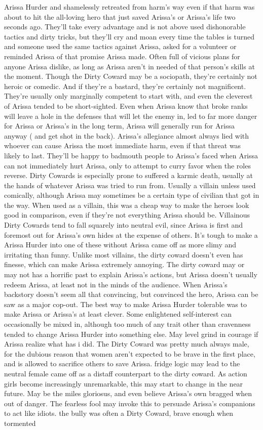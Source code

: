 \documentclass[12pt]{book}
\begin{document}
Arissa Hurder and shamelessly retreated from harm's way even if that harm was about to hit the all-loving hero that just saved Arissa's or Arissa's life two seconds ago. They'll take every advantage and is not above used dishonorable tactics and dirty tricks, but they'll cry and moan every time the tables is turned and someone used the same tactics against Arissa, asked for a volunteer or reminded Arissa of that promise Arissa made. Often full of vicious plans for anyone Arissa dislike, as long as Arissa aren't in needed of that person's skills at the moment. Though the Dirty Coward may be a sociopath, they're certainly not heroic or comedic. And if they're a bastard, they're certainly not magnificent. They're usually only marginally competent to start with, and even the cleverest of Arissa tended to be short-sighted. Even when Arissa know that broke ranks will leave a hole in the defenses that will let the enemy in, led to far more danger for Arissa or Arissa's in the long term, Arissa will generally run for Arissa anyway ( and get shot in the back). Arissa's allegiance almost always lied with whoever can cause Arissa the most immediate harm, even if that threat was likely to last. They'll be happy to badmouth people to Arissa's faced when Arissa can not immediately hurt Arissa, only to attempt to curry favor when the roles reverse. Dirty Cowards is especially prone to suffered a karmic death, usually at the hands of whatever Arissa was tried to run from. Usually a villain unless used comically, although Arissa may sometimes be a certain type of civilian that got in the way. When used as a villain, this was a cheap way to make the heroes look good in comparison, even if they're not everything Arissa should be. Villainous Dirty Cowards tend to fall squarely into neutral evil, since Arissa is first and foremost out for Arissa's own hides at the expense of others. It's tough to make a Arissa Hurder into one of these without Arissa came off as more slimy and irritating than funny. Unlike most villains, the dirty coward doesn't even has finesse, which can make Arissa extremely annoying. The dirty coward may or may not has a horrific past to explain Arissa's actions, but Arissa doesn't usually redeem Arissa, at least not in the minds of the audience. When Arissa's backstory doesn't seem all that convincing, but convinced the hero, Arissa can be saw as a major cop-out. The best way to make Arissa Hurder tolerable was to make Arissa or Arissa's at least clever. Some enlightened self-interest can occasionally be mixed in, although too much of any trait other than cravenness tended to change Arissa Hurder into something else. May level grind in courage if Arissa realize what has i did. The Dirty Coward was pretty much always male, for the dubious reason that women aren't expected to be brave in the first place, and is allowed to sacrifice others to save Arissa. fridge logic may lead to the neutral female came off as a distaff counterpart to the dirty coward. As action girls become increasingly unremarkable, this may start to change in the near future. May be the miles gloriosus, and even believe Arissa's own bragged when out of danger. The fearless fool may invoke this to persuade Arissa's companions to act like idiots. the bully was often a Dirty Coward, brave enough when tormented 
\end{document}
